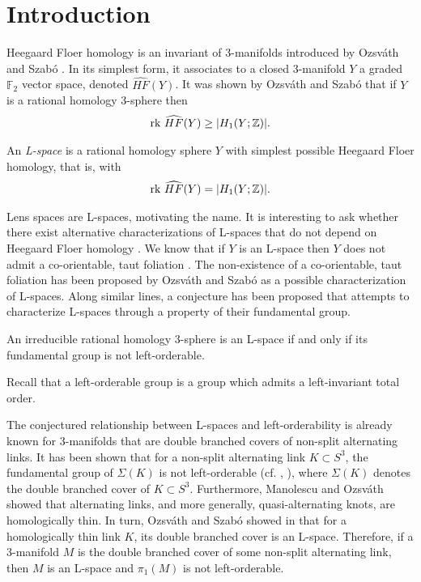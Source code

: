\section{Introduction}

Heegaard Floer homology is an invariant of 3-manifolds introduced by Ozsv\'{a}th and Szab\'{o} \cite{OzsvathSzabo}. In its simplest form, it associates to a closed 3-manifold $Y$ a graded $\mathbb{F}_2$ vector space, denoted $\widehat{HF}(Y)$. It was shown by Ozsv\'{a}th and Szab\'{o} \cite[Proposition 5.1]{OS2} that if $Y$ is a rational homology 3-sphere then
\begin{align*}
\textup{rk }\widehat{HF}(Y)\geq{}|H_1(Y ; \mathbb{Z})|.
\end{align*}

\begin{definition}An \emph{L-space} is a rational homology sphere $Y$ with simplest possible Heegaard Floer homology, that is, with
\begin{align*}
\textup{rk } \widehat{HF}(Y) = |H_1(Y ; \mathbb{Z})|.
\end{align*}
\end{definition}

Lens spaces are L-spaces, motivating the name. It is interesting to ask whether there exist alternative characterizations of L-spaces that do not depend on Heegaard Floer homology \cite[Question 11]{OS4}. We know that if $Y$ is an L-space then $Y$ does not admit a co-orientable, taut foliation \cite{OS3}. The non-existence of a co-orientable, taut foliation has been proposed by Ozsv\'{a}th and Szab\'{o} as a possible characterization of L-spaces. Along similar lines, a conjecture has been proposed \cite{BoyerGordonWatson} that attempts to characterize L-spaces through a property of their fundamental group.

\begin{conjecture_main}
An irreducible rational homology 3-sphere is an L-space if and only if its fundamental group is not left-orderable.
\end{conjecture_main}

Recall that a left-orderable group is a group which admits a left-invariant total order.

The conjectured relationship between L-spaces and left-orderability is already known for 3-manifolds that are double branched covers of non-split alternating links. It has been shown that for a non-split alternating link $K\subset S^3$, the fundamental group of $\Sigma{}(K)$ is not left-orderable \cite{BoyerGordonWatson} (cf. \cite{GreeneJE}, \cite{Ito}), where $\Sigma{}(K)$ denotes the double branched cover of $K\subset{}S^3$. Furthermore, Manolescu and Ozsv\'{a}th \cite{ManolescuOzsvath} showed that alternating links, and more generally, quasi-alternating knots, are homologically thin. In turn, Ozsv\'{a}th and Szab\'{o} showed in \cite{OzsvathandSzabo} that for a homologically thin link $K$, its double branched cover is an L-space. Therefore, if a 3-manifold $M$ is the double branched cover of some non-split alternating link, then $M$ is an L-space and $\pi_1(M)$ is not left-orderable.

